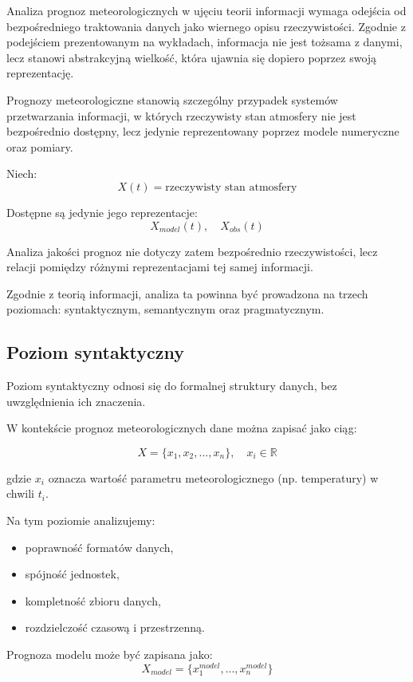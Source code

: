 \documentclass[a4paper,12pt]{article}
\begin{document}
Analiza prognoz meteorologicznych w ujęciu teorii informacji wymaga odejścia
od bezpośredniego traktowania danych jako wiernego opisu rzeczywistości.
Zgodnie z podejściem prezentowanym na wykładach, informacja nie jest tożsama
z danymi, lecz stanowi abstrakcyjną wielkość, która ujawnia się dopiero poprzez
swoją reprezentację.


Prognozy meteorologiczne stanowią szczególny przypadek systemów przetwarzania informacji,
w których rzeczywisty stan atmosfery nie jest bezpośrednio dostępny, lecz jedynie
reprezentowany poprzez modele numeryczne oraz pomiary.

Niech:
\[
X(t) = \text{rzeczywisty stan atmosfery}
\]

Dostępne są jedynie jego reprezentacje:
\[
X_{model}(t), \quad X_{obs}(t)
\]

Analiza jakości prognoz nie dotyczy zatem bezpośrednio rzeczywistości,
lecz relacji pomiędzy różnymi reprezentacjami tej samej informacji.

Zgodnie z teorią informacji, analiza ta powinna być prowadzona na trzech poziomach:
syntaktycznym, semantycznym oraz pragmatycznym.

\newpage
\subsection{Poziom syntaktyczny}

Poziom syntaktyczny odnosi się do formalnej struktury danych, bez uwzględnienia ich znaczenia.

W kontekście prognoz meteorologicznych dane można zapisać jako ciąg:

\[
X = \{x_1, x_2, ..., x_n\}, \quad x_i \in \mathbb{R}
\]

gdzie $x_i$ oznacza wartość parametru meteorologicznego (np. temperatury)
w chwili $t_i$.

Na tym poziomie analizujemy:
\begin{itemize}
    \item poprawność formatów danych,
    \item spójność jednostek,
    \item kompletność zbioru danych,
    \item rozdzielczość czasową i przestrzenną.
\end{itemize}

Prognoza modelu może być zapisana jako:
\[
X_{model} = \{x^{model}_1, ..., x^{model}_n\}
\]
\end{document}
